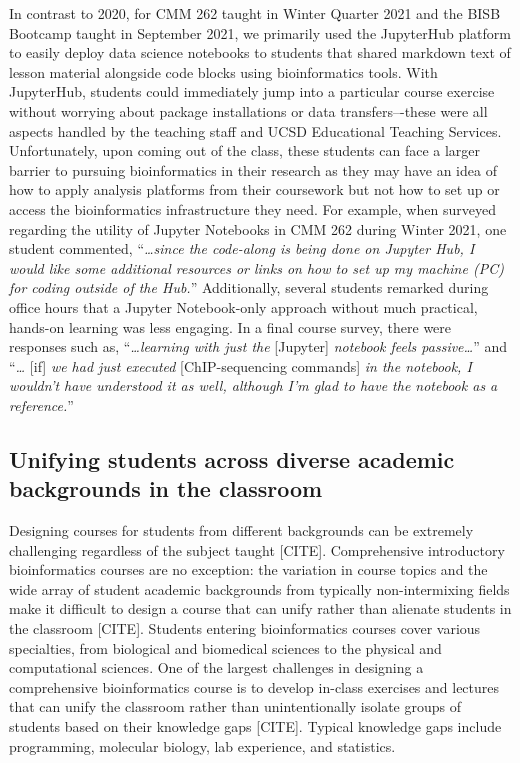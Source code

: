 In contrast to 2020, for CMM 262 taught in Winter Quarter 2021 and the BISB Bootcamp taught in September 2021, we primarily used the JupyterHub platform to easily deploy data science notebooks to students that shared markdown text of lesson material alongside code blocks using bioinformatics tools. With JupyterHub, students could immediately jump into a particular course exercise without worrying about package installations or data transfers–-these were all aspects handled by the teaching staff and UCSD Educational Teaching Services. Unfortunately, upon coming out of the class, these students can face a larger barrier to pursuing bioinformatics in their research as they may have an idea of how to apply analysis platforms from their coursework but not how to set up or access the bioinformatics infrastructure they need. For example, when surveyed regarding the utility of Jupyter Notebooks in CMM 262 during Winter 2021, one student commented, “\textit{…since the code-along is being done on Jupyter Hub, I would like some additional resources or links on how to set up my machine (PC) for coding outside of the Hub.}” Additionally, several students remarked during office hours that a Jupyter Notebook-only approach without much practical, hands-on learning was less engaging. In a final course survey, there were responses such as, “\textit{…learning with just the} [Jupyter] \textit{notebook feels passive…}” and “\textit{…} [if] \textit{we had just executed} [ChIP-sequencing commands] \textit{in the notebook, I wouldn't have understood it as well, although I'm glad to have the notebook as a reference.}”

\subsection{Unifying students across diverse academic backgrounds in the classroom}

Designing courses for students from different backgrounds can be extremely challenging regardless of the subject taught [CITE]. Comprehensive introductory bioinformatics courses are no exception: the variation in course topics and the wide array of student academic backgrounds from typically non-intermixing fields make it difficult to design a course that can unify rather than alienate students in the classroom [CITE]. Students entering bioinformatics courses cover various specialties, from biological and biomedical sciences to the physical and computational sciences. One of the largest challenges in designing a comprehensive bioinformatics course is to develop in-class exercises and lectures that can unify the classroom rather than unintentionally isolate groups of students based on their knowledge gaps [CITE]. Typical knowledge gaps include programming, molecular biology, lab experience, and statistics. 

